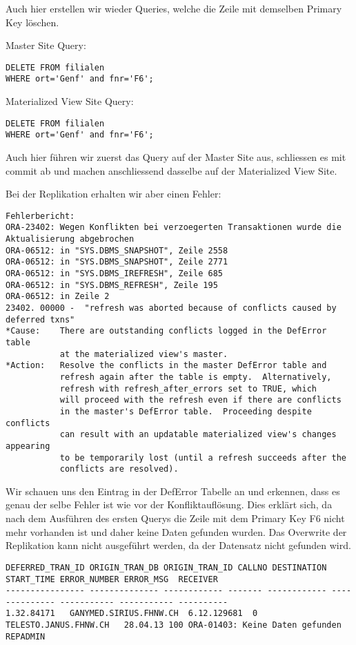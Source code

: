\documentclass[11pt,a4paper,parskip=half]{scrartcl}
\begin{document}
Auch hier erstellen wir wieder Queries, welche die Zeile mit demselben Primary Key löschen.

Master Site Query:
\begin{lstlisting}
DELETE FROM filialen
WHERE ort='Genf' and fnr='F6'; 
\end{lstlisting}

Materialized View Site Query:
\begin{lstlisting}
DELETE FROM filialen
WHERE ort='Genf' and fnr='F6'; 
\end{lstlisting}

Auch hier führen wir zuerst das Query auf der Master Site aus, schliessen es mit commit ab und machen anschliessend dasselbe auf der Materialized View Site.

Bei der Replikation erhalten wir aber einen Fehler:
\begin{lstlisting}
Fehlerbericht:
ORA-23402: Wegen Konflikten bei verzoegerten Transaktionen wurde die Aktualisierung abgebrochen
ORA-06512: in "SYS.DBMS_SNAPSHOT", Zeile 2558
ORA-06512: in "SYS.DBMS_SNAPSHOT", Zeile 2771
ORA-06512: in "SYS.DBMS_IREFRESH", Zeile 685
ORA-06512: in "SYS.DBMS_REFRESH", Zeile 195
ORA-06512: in Zeile 2
23402. 00000 -  "refresh was aborted because of conflicts caused by deferred txns"
*Cause:    There are outstanding conflicts logged in the DefError table
           at the materialized view's master.
*Action:   Resolve the conflicts in the master DefError table and
           refresh again after the table is empty.  Alternatively,
           refresh with refresh_after_errors set to TRUE, which
           will proceed with the refresh even if there are conflicts
           in the master's DefError table.  Proceeding despite conflicts
           can result with an updatable materialized view's changes appearing
           to be temporarily lost (until a refresh succeeds after the
           conflicts are resolved).
\end{lstlisting}

Wir schauen uns den Eintrag in der DefError Tabelle an und erkennen, dass es genau der selbe Fehler ist wie vor der Konfliktauflösung. Dies erklärt sich, da nach dem Ausführen des ersten Querys die Zeile mit dem Primary Key F6 nicht mehr vorhanden ist und daher keine Daten gefunden wurden. Das Overwrite der Replikation kann nicht ausgeführt werden, da der Datensatz nicht gefunden wird.
\begin{lstlisting}
DEFERRED_TRAN_ID ORIGIN_TRAN_DB ORIGIN_TRAN_ID CALLNO DESTINATION START_TIME ERROR_NUMBER ERROR_MSG  RECEIVER
---------------- -------------- ------------ ------- ------------ -------------- ----------- ----------- ----------
1.32.84171   GANYMED.SIRIUS.FHNW.CH  6.12.129681  0 TELESTO.JANUS.FHNW.CH   28.04.13 100 ORA-01403: Keine Daten gefunden  REPADMIN
\end{lstlisting}
\end{document}

